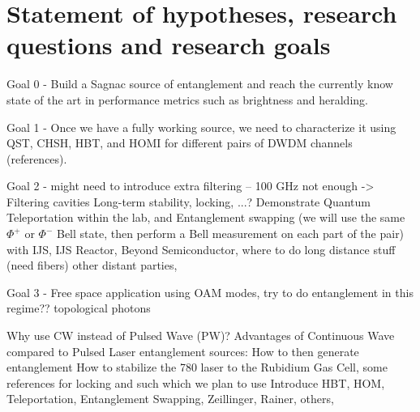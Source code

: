 \documentclass{article}
\theoremstyle{mytheoremstyle}
\theoremstyle{mytheoremstyle}
\theoremstyle{myproblemstyle}
\begin{document}


\newpage
\section{Statement of hypotheses, research questions and research goals}

Goal 0 - Build a Sagnac source of entanglement and reach the currently know state of the art in performance metrics such as brightness and heralding.

Goal 1 - Once we have a fully working source, we need to characterize it using QST, CHSH, HBT, and HOMI for different pairs of DWDM channels (references).

Goal 2 - might need to introduce extra filtering -- 100 GHz not enough -> Filtering cavities
Long-term stability, locking, ...? Demonstrate Quantum Teleportation within the lab, and Entanglement swapping (we will use the same $\Phi^+$ or $\Phi^-$ Bell state,
then perform a Bell measurement on each part of the pair) with IJS, IJS Reactor, Beyond Semiconductor, where to do
long distance stuff (need fibers) other distant parties,

Goal 3 - Free space application using OAM modes, try to do entanglement in this regime?? topological photons

Why use CW instead of Pulsed Wave (PW)?
Advantages of Continuous Wave compared to Pulsed Laser entanglement sources:
How to then generate entanglement
How to stabilize the 780 laser to the Rubidium Gas Cell, some references for locking and such which we plan to use
Introduce HBT, HOM, Teleportation, Entanglement Swapping, Zeillinger, Rainer, others,
\end{document}
